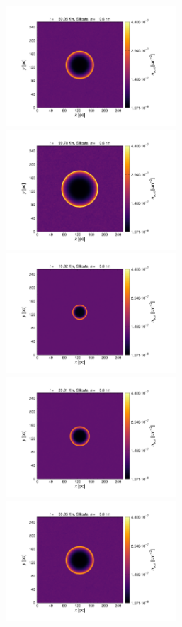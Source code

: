 \documentclass[fleqn,usenatbib]{mnras}
\begin{document}
\begin{figure}
 \includegraphics[trim=5.2cm 1.5cm 9.3cm 2.0cm, clip=true,page=3,height = 4.5cm]{Pics/Pics_C1/Density_1_00201.pdf}\hspace*{-0.1cm}
 \includegraphics[trim=5.2cm 1.5cm 3.2cm 2.0cm, clip=true,page=3,height = 4.5cm]{Pics/Pics_C1/Density_1_00400.pdf}\\
  \includegraphics[trim=2.8cm 1.5cm 9.3cm 2.0cm, clip=true,page=4,height = 4.5cm]{Pics/Pics_C1/Density_1_00041.pdf}\hspace*{-0.1cm}
 \includegraphics[trim=5.2cm 1.5cm 9.3cm 2.0cm, clip=true,page=4,height = 4.5cm]{Pics/Pics_C1/Density_1_00081.pdf}\hspace*{-0.1cm}
 \includegraphics[trim=5.2cm 1.5cm 9.3cm 2.0cm, clip=true,page=4,height = 4.5cm]{Pics/Pics_C1/Density_1_00201.pdf}\hspace*{-0.1cm}

\end{figure}
\end{document}
